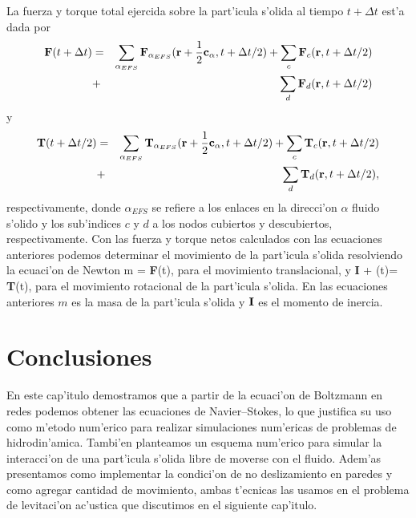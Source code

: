 La fuerza y torque total  ejercida sobre la part'icula s'olida al tiempo $t + \Delta t$ est'a dada por
\begin{eqnarray}
\nonumber 
\textbf F(t+\Delta t) &=& \sum_{\alpha_{EFS}} \textbf F_{\alpha_{EFS}}(\textbf r+\dfrac{1}{2}\textbf c_\alpha, t +\Delta t/2)
+ \sum_{c} \textbf F_c (\textbf r,t+\Delta t/2) \\
&+& \sum_{d} \textbf F_d (\textbf r,t+\Delta t/2) 
\end{eqnarray}
y
\begin{eqnarray}
\nonumber 
\textbf T(t+\Delta t/2) &=& \sum_{\alpha_{EFS}} \textbf T_{\alpha_{EFS}}(\textbf r+\dfrac{1}{2}\textbf c_\alpha, t +\Delta t/2)
+ \sum_{c} \textbf T_c (\textbf r,t+\Delta t/2) \\ 
&+& \sum_{d} \textbf T_d (\textbf r,t+\Delta t/2),
\end{eqnarray}
respectivamente, donde $\alpha_{EFS}$ se refiere a los enlaces en la direcci'on $\alpha$ fluido s'olido   y los sub'indices
$c$ y $d$ a los nodos cubiertos y descubiertos, respectivamente.  
Con las fuerza y torque netos calculados con las ecuaciones anteriores podemos determinar
el movimiento de la part'icula s'olida resolviendo la ecuaci'on de Newton
\BE
m  = \textbf F(t),
\EE
para el movimiento translacional, y
\BE
\textbf I \cdot {} + \Omega(t) = \textbf T(t),
\EE
para el movimiento rotacional de la part'icula s'olida. En las ecuaciones anteriores $m$  es la masa
de la part'icula s'olida y $\textbf I$ es el momento de inercia. 

  



\section{Conclusiones}


En este cap'itulo demostramos que a partir de la ecuaci'on de Boltzmann en redes
podemos obtener las ecuaciones de Navier--Stokes, lo que justifica su uso como m'etodo
num'erico para realizar simulaciones num'ericas de problemas de hidrodin'amica. Tambi'en
planteamos un esquema num'erico para simular la interacci'on de una part'icula
s'olida libre de moverse con el fluido. Adem'as presentamos como implementar la condici'on
de no deslizamiento en paredes y como agregar cantidad  de movimiento, ambas t'ecnicas
las usamos en el problema de levitaci'on ac'ustica que discutimos en el siguiente cap'itulo.
